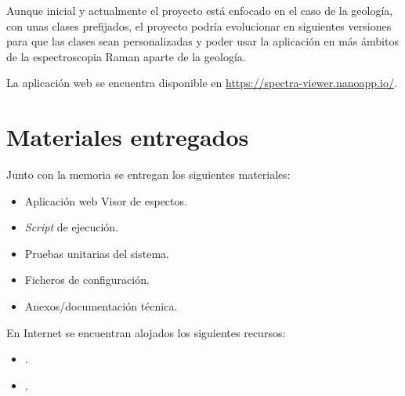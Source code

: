 Aunque inicial y actualmente el proyecto está enfocado en el caso de la
geología, con unas clases prefijados, el proyecto podría evolucionar en
siguientes versiones para que las clases sean personalizadas y poder usar la
aplicación en más ámbitos de la espectroscopia Raman aparte de la geología.

La aplicación web se encuentra disponible en 
\url{https://spectra-viewer.nanoapp.io/}.

\section{Materiales entregados}

Junto con la memoria se entregan los siguientes materiales:
\begin{itemize}
	\tightlist	
	\item Aplicación web Visor de espectos.
	\item \textit{Script} de ejecución.
	\item Pruebas unitarias del sistema.
	\item Ficheros de configuración.
	\item Anexos/documentación técnica.
\end{itemize}
En Internet se encuentran alojados los siguientes recursos:
\begin{itemize}
	\tightlist	
	\item {}.
	\item {}.
\end{itemize}
